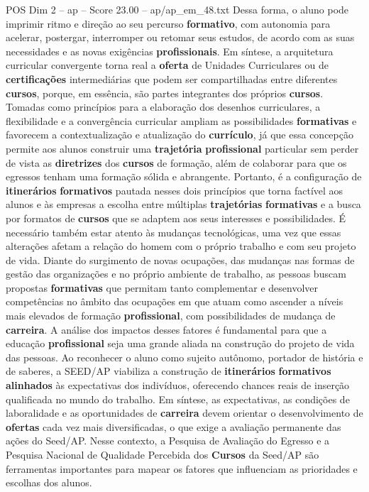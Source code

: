 \begin{textsample}{POS Dim 2 – ap – Score 23.00 – ap/ap\_em\_48.txt}
Dessa forma, o aluno pode imprimir ritmo e direção ao seu percurso \textbf{formativo}, com autonomia para acelerar, postergar, interromper ou retomar seus estudos, de acordo com as suas necessidades e as novas exigências \textbf{profissionais}.
Em síntese, a arquitetura curricular convergente torna real a \textbf{oferta} de Unidades Curriculares ou de \textbf{certificações} intermediárias que podem ser compartilhadas entre diferentes \textbf{cursos}, porque, em essência, são partes integrantes dos próprios \textbf{cursos}.
Tomadas como princípios para a elaboração dos desenhos curriculares, a flexibilidade e a convergência curricular ampliam as possibilidades \textbf{formativas} e favorecem a contextualização e atualização do \textbf{currículo}, já que essa concepção permite aos alunos construir uma \textbf{trajetória} \textbf{profissional} particular sem perder de vista as \textbf{diretrizes} dos \textbf{cursos} de formação, além de colaborar para que os egressos tenham uma formação sólida e abrangente.
Portanto, é a configuração de \textbf{itinerários} \textbf{formativos} pautada nesses dois princípios que torna factível aos alunos e às empresas a escolha entre múltiplas \textbf{trajetórias} \textbf{formativas} e a busca por formatos de \textbf{cursos} que se adaptem aos seus interesses e possibilidades.
É necessário também estar atento às mudanças tecnológicas, uma vez que essas alterações afetam a relação do homem com o próprio trabalho e com seu projeto de vida.
Diante do surgimento de novas ocupações, das mudanças nas formas de gestão das organizações e no próprio ambiente de trabalho, as pessoas buscam propostas \textbf{formativas} que permitam tanto complementar e desenvolver competências no âmbito das ocupações em que atuam como ascender a níveis mais elevados de formação \textbf{profissional}, com possibilidades de mudança de \textbf{carreira}.
A análise dos impactos desses fatores é fundamental para que a educação \textbf{profissional} seja uma grande aliada na construção do projeto de vida das pessoas.
Ao reconhecer o aluno como sujeito autônomo, portador de história e de saberes, a SEED/AP viabiliza a construção de \textbf{itinerários} \textbf{formativos} \textbf{alinhados} às expectativas dos indivíduos, oferecendo chances reais de inserção qualificada no mundo do trabalho.
Em síntese, as expectativas, as condições de laboralidade e as oportunidades de \textbf{carreira} devem orientar o desenvolvimento de \textbf{ofertas} cada vez mais diversificadas, o que exige a avaliação permanente das ações do Seed/AP.
Nesse contexto, a Pesquisa de Avaliação do Egresso e a Pesquisa Nacional de Qualidade Percebida dos \textbf{Cursos} da Seed/AP são ferramentas importantes para mapear os fatores que influenciam as prioridades e escolhas dos alunos.

\end{textsample}
